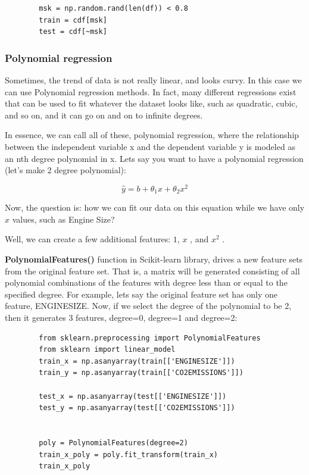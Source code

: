 	\begin{verbatim}
		msk = np.random.rand(len(df)) < 0.8
		train = cdf[msk]
		test = cdf[~msk]
	\end{verbatim}

	\subsubsection{Polynomial regression}
	
	Sometimes, the trend of data is not really linear, and looks curvy. In this case we can use Polynomial regression methods. In fact, many different regressions exist that can be used to fit whatever the dataset looks like, such as quadratic, cubic, and so on, and it can go on and on to infinite degrees.
	
	In essence, we can call all of these, polynomial regression, where the relationship between the independent variable x and the dependent variable y is modeled as an nth degree polynomial in x. Lets say you want to have a polynomial regression (let's make 2 degree polynomial):
	
	\begin{equation}
		\hat{y} = b + \theta_{1}x + \theta_{2}x^{2}
	\end{equation}

	Now, the question is: how we can fit our data on this equation while we have only $x$ values, such as Engine Size? 
	
	Well, we can create a few additional features: $1$,  $x$ , and  $x^{2}$ .
		
	\textbf{PolynomialFeatures()} function in Scikit-learn library, drives a new feature sets from the original feature set. That is, a matrix will be generated consisting of all polynomial combinations of the features with degree less than or equal to the specified degree. For example, lets say the original feature set has only one feature, ENGINESIZE. Now, if we select the degree of the polynomial to be 2, then it generates 3 features, degree=0, degree=1 and degree=2:
	
	\begin{verbatim}
		from sklearn.preprocessing import PolynomialFeatures
		from sklearn import linear_model
		train_x = np.asanyarray(train[['ENGINESIZE']])
		train_y = np.asanyarray(train[['CO2EMISSIONS']])
		
		test_x = np.asanyarray(test[['ENGINESIZE']])
		test_y = np.asanyarray(test[['CO2EMISSIONS']])
		
		
		poly = PolynomialFeatures(degree=2)
		train_x_poly = poly.fit_transform(train_x)
		train_x_poly
	\end{verbatim}


